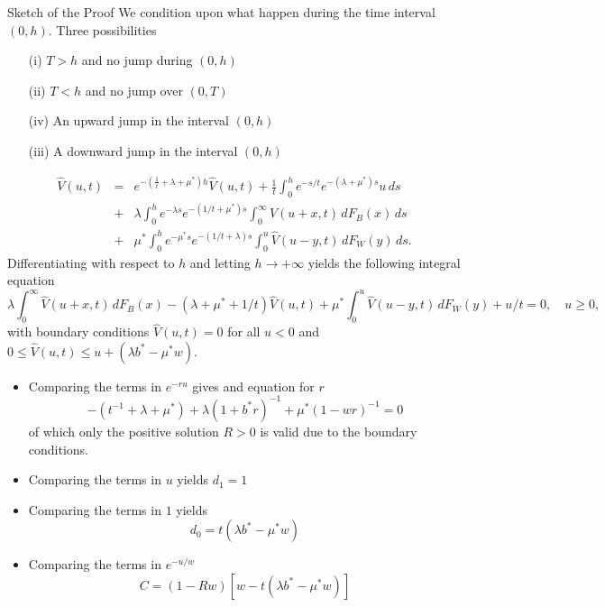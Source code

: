 \documentclass{beamer}
\def \w{\widehat}
\begin{document}
\begin{frame}[allowframebreaks]{Sketch of the Proof}
\scriptsize
We condition upon what happen during the time interval $(0,h)$. Three possibilities
\begin{itemize}
  \item[(i)] $T>h$ and no jump during $(0,h)$
  \item[(ii)] $T<h$ and no jump over $(0,T)$
  \item[(iv)] An upward jump in the interval $(0,h)$
  \item[(iii)] A downward jump in the interval $(0,h)$
\end{itemize}
  \begin{eqnarray*}\label{neu0}
      \w{V}(u,t)&=& e^{-(\frac{1}{t}+\lambda+\mu^\ast)h}\w{V}(u,t) + \frac{1}{t}\int_0^h e^{-{s}/{t}}e^{-(\lambda +\mu^\ast) s} u\,ds\\
      & +& \lambda\int_0^he^{-\lambda s} e^{-({1}/{t}+\mu^\ast) s} \int_0^\infty\w{V}(u+x,t)\,dF_{B}(x)\,ds\\
      &  +&\mu^\ast \int_0^he^{-\mu^\ast s} e^{-({1}/{t}+\lambda) s}\int_0^u \w{V}(u-y,t) \,dF_W(y)\,ds.
  \end{eqnarray*}
  Differentiating with respect to $h$ and letting $h\rightarrow +\infty$ yields the following integral equation
  \begin{equation} \label{inteq}
    \lambda\int_0^\infty\w{V}(u+x,t)\,dF_{B}(x)-(\lambda+\mu^\ast+{1}/{t})\w{V}(u,t)+\mu^\ast\int_0^u \w{V}(u-y,t) \,dF_W(y)+{u}/{t}=0,\quad u\ge 0,
  \end{equation}
  with boundary conditions $\w{V}(u,t)=0$ for all $u<0$ and $0\leq\w{V}(u,t)\leq u+(\lambda b^\ast - \mu^\ast w)$. 
  \begin{itemize}
    \item Comparing the terms in $e^{-r u}$ gives and equation for $r$
    $$
    -(t^{-1}+\lambda+\mu^\ast)+\lambda(1+b^\ast r)^{-1}+\mu^\ast(1-wr)^{-1}=0
    $$
    of which only the positive solution $R>0$ is valid due to the boundary conditions.
    \item Comparing the terms in $u$ yields $d_1 = 1$
    \item Comparing the terms in $1$ yields
    $$
    d_0 = t(\lambda b^\ast-\mu^\ast w)
    $$
    \item Comparing the terms in $e^{-u/w}$
    $$
    C = (1 - Rw)[w-t(\lambda b^\ast-\mu^\ast w)]
    $$
  \end{itemize}
\end{frame}
\end{document}
